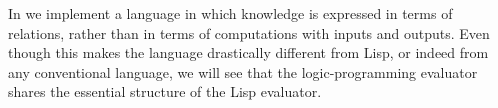 In  we implement a  language in which knowledge is expressed in terms of relations, rather than in terms of computations with inputs and outputs.
Even though this makes the language drastically different from Lisp, or indeed from any conventional language, we will see that the logic-programming evaluator shares the essential structure of the Lisp evaluator.











